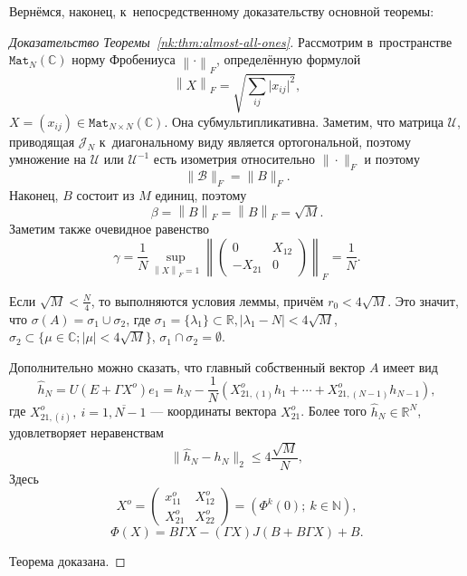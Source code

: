 \documentclass[14pt,a4paper]{extarticle}
\theoremstyle{definition}
\begin{document}
Верн\"емся, наконец, к~непосредственному доказательству основной теоремы:
\begin{proof}[Доказательство Теоремы~\ref{nk:thm:almost-all-ones}]
    Рассмотрим в~пространстве \( \mathtt{Mat}_{N}(\mathbb{C}) \)
    норму Фробениуса \( {\left\|\cdot\right\|}_{F} \),
    определ\"енную формулой
    \[ {\left\|X\right\|}_{F} = \sqrt{\sum_{ij} \lvert x_{ij}\rvert^2}, \]
    \( X = (x_{ij})\in\mathtt{Mat}_{N{\times}N}(\mathbb{C}) \).
    Она суб\-мульти\-пли\-кативна.
    Заметим, что матрица \( \mathcal{U} \),
    приводящая \( \mathcal{J}_N \) к~диагональному виду
    является ортогональной,
    поэтому умножение на \( \mathcal{U} \) или \(\mathcal{U}^{-1}\)
    есть изометрия относительно \( \|\cdot\|_F \) и поэтому
    \[ \|\mathcal{B}\|_F=\|B\|_F. \]
    Наконец,
    \( B \) состоит из \( M \) единиц, поэтому
    \[
        \beta = {\left\|B\right\|}_{F} =
        {\left\|B\right\|}_{F} = \sqrt{M}.
        \]
    Заметим также очевидное равенство
    \[
        \gamma = \frac1N
                \sup_{{\left\|X\right\|}_{F}=1}{\left\|\begin{pmatrix}0 & X_{12} \\ -X_{21} & 0\end{pmatrix}\right\|}_{F}
                = \frac1N. \]
    
    Если
     \( \sqrt{M} < \frac{N}{4} \),
     то выполняются условия леммы,
     прич\"ем \( r_0 < 4\sqrt{M} \).
    Это значит, что
     \( \sigma(A) = \sigma_1 \cup \sigma_2 \),
     где \( \sigma_1 = \{ \lambda_1 \}\subset\mathbb{R}, \lvert \lambda_1 - N \rvert < 4\sqrt{M} \),
     \( \sigma_2 \subset \{ \mu\in\mathbb{C}; \lvert\mu\rvert < 4\sqrt{M} \} \),
     \( \sigma_1 \cap \sigma_2 = \emptyset \).

Дополнительно можно сказать, что 
     главный собственный вектор \( A \) имеет вид
     \[
       \hat{h}_N = U(E+\Gamma X^o) e_1 =
       h_N - \frac1N (X_{21,(1)}^o h_1 + \cdots + X_{21, (N{-}1)}^o h_{N{-}1}),
     \]
     где \( X_{21,(i)}^o,\ i=\overline{1,N{-}1} \) --- координаты вектора
     \( X_{21}^o \).
     Более того \( \hat{h}_N\in\mathbb{R}^{N} \),
     удовлетворяет неравенствам
     \[
       \|\hat{h}_N - h_N\|_2 \leq 4\frac{\sqrt{M}}{N},
     \]
     Здесь
     \[ X^o =
       \begin{pmatrix}
         x_{11}^o & X_{12}^o \\
         X_{21}^o & X_{22}^o
       \end{pmatrix}
       = \left( \Phi^k(0);\ k\in\mathbb{N} \right), \]
     \[
       \Phi(X) = B\Gamma X - (\Gamma X)J(B + B\Gamma X) + B.
     \]
     
     Теорема доказана.
   \end{proof}
\end{document}
